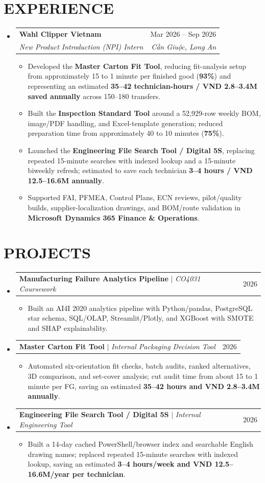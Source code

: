 \documentclass[a4paper,10pt]{article}
\makeatletter
\newcommand{\resumeItem}[1]{\item\small{#1\vspace{-1pt}}}
\newcommand{\resumeSubheading}[4]{
  \vspace{-1pt}\item
  \begin{tabular*}{0.97\textwidth}[t]{l@{\extracolsep{\fill}}r}
    \textbf{#1} & #2 \\
    \textit{\small #3} & \textit{\small #4} \\
  \end{tabular*}\vspace{-6pt}
}
\newcommand{\resumeProjectHeading}[2]{
  \item
  \begin{tabularx}{0.97\textwidth}[t]{@{}Xr@{}}
    \small #1 & \small #2 \\
  \end{tabularx}\vspace{-2pt}
}
\newcommand{\resumeSubHeadingListStart}{\begin{itemize}[leftmargin=0.15in,label={},itemsep=0pt,topsep=2pt,parsep=0pt,partopsep=0pt]}
\newcommand{\resumeSubHeadingListEnd}{\end{itemize}}
\newcommand{\resumeItemListStart}{\begin{itemize}[leftmargin=0.22in,itemsep=1.2pt,topsep=0.5pt,parsep=0pt]}
\newcommand{\resumeItemListEnd}{\end{itemize}\vspace{-2pt}}
\makeatother
\begin{document}
\section{EXPERIENCE}
\resumeSubHeadingListStart
  \resumeSubheading
    {Wahl Clipper Vietnam}{Mar 2026 -- Sep 2026}
    {New Product Introduction (NPI) Intern}{Cần Giuộc, Long An}
  \resumeItemListStart
    \resumeItem{Developed the \textbf{Master Carton Fit Tool}, reducing fit-analysis setup from approximately 15 to 1 minute per finished good (\textbf{93\%}) and representing an estimated \textbf{35--42 technician-hours / VND 2.8--3.4M saved annually} across 150--180 transfers.}
    \resumeItem{Built the \textbf{Inspection Standard Tool} around a 52,929-row weekly BOM, image/PDF handling, and Excel-template generation; reduced preparation time from approximately 40 to 10 minutes (\textbf{75\%}).}
    \resumeItem{Launched the \textbf{Engineering File Search Tool / Digital 5S}, replacing repeated 15-minute searches with indexed lookup and a 15-minute biweekly refresh; estimated to save each technician \textbf{3--4 hours / VND 12.5--16.6M annually}.}
    \resumeItem{Supported FAI, PFMEA, Control Plans, ECN reviews, pilot/quality builds, supplier-localization drawings, and BOM/route validation in \textbf{Microsoft Dynamics 365 Finance \& Operations}.}
  \resumeItemListEnd
\resumeSubHeadingListEnd

\section{PROJECTS}
\resumeSubHeadingListStart
  \resumeProjectHeading
    {\textbf{Manufacturing Failure Analytics Pipeline} $|$ \emph{CO4031 Coursework}}{2026}
  \resumeItemListStart
    \resumeItem{Built an AI4I 2020 analytics pipeline with Python/pandas, PostgreSQL star schema, SQL/OLAP, Streamlit/Plotly, and XGBoost with SMOTE and SHAP explainability.}
  \resumeItemListEnd

  \resumeProjectHeading
    {\textbf{Master Carton Fit Tool} $|$ \emph{Internal Packaging Decision Tool}}{2026}
  \resumeItemListStart
    \resumeItem{Automated six-orientation fit checks, batch audits, ranked alternatives, 3D comparison, and set-cover analysis; cut audit time from about 15 to 1 minute per FG, saving an estimated \textbf{35--42 hours and VND 2.8--3.4M annually}.}
  \resumeItemListEnd

  \resumeProjectHeading
    {\textbf{Engineering File Search Tool / Digital 5S} $|$ \emph{Internal Engineering Tool}}{2026}
  \resumeItemListStart
    \resumeItem{Built a 14-day cached PowerShell/browser index and searchable English drawing names; replaced repeated 15-minute searches with indexed lookup, saving an estimated \textbf{3--4 hours/week and VND 12.5--16.6M/year per technician}.}
  \resumeItemListEnd
\resumeSubHeadingListEnd
\end{document}
